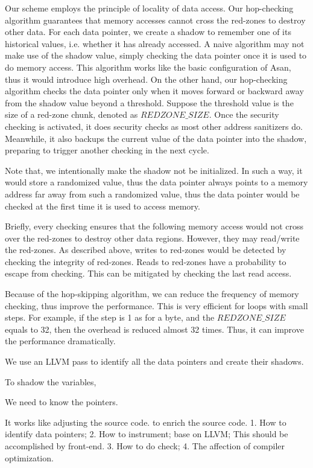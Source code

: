 Our scheme employs the principle of locality of data access.
Our hop-checking algorithm guarantees that memory accesses cannot cross the red-zones to destroy other data.
For each data pointer, we create a shadow to remember one of its historical values, i.e. whether it has already accessed.
A naive algorithm may not make use of the shadow value,
simply checking the data pointer once it is used to do memory access.
This algorithm works like the basic configuration of Asan, thus it would introduce high overhead.
On the other hand, our hop-checking algorithm checks the data pointer only when it moves forward or backward away from the shadow value beyond a threshold.
Suppose the threshold value is the size of a red-zone chunk, denoted as $REDZONE\_SIZE$.
Once the security checking is activated, it does security checks as most other address sanitizers do.
Meanwhile, it also backups the current value of the data pointer into the shadow,
preparing to trigger another checking in the next cycle.

Note that, we intentionally make the shadow not be initialized.
In such a way, it would store a randomized value, thus the data pointer always points to a memory address far away from such a  randomized value,
thus the data pointer would be checked at the first time it is used to access memory.

Briefly, every checking ensures that the following memory access would not cross over the red-zones to destroy other data regions.
However, they may read/write the red-zones.
As described above, writes to red-zones would be detected by checking the integrity of red-zones.
Reads to red-zones have a probability to escape from checking.
This can be mitigated by checking the last read access.

Because of the hop-skipping algorithm, we can reduce the frequency of memory checking, thus improve the performance.
This is very efficient for loops with small steps. For example, if the step is 1 as for a byte, and the $REDZONE\_SIZE$
equals to 32, then the overhead is reduced almost  32 times. Thus, it can improve the performance dramatically.

We use an LLVM pass to identify all the data pointers and create their shadows.


To shadow the variables,

We need to know the pointers.

It works like adjusting the source code. to enrich the source code.
1. How to identify data pointers;
2. How to instrument; base on LLVM; This should be accomplished by front-end.
3. How to do check;
4. The affection of compiler optimization.

